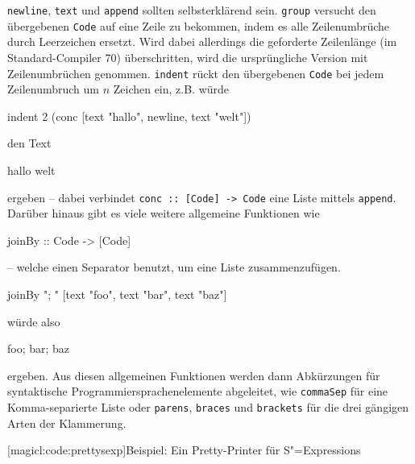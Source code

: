 \documentclass[11pt, a4paper, bibgerm]{scrbook}
\newenvironment{DIFnomarkup}{}{}
\newcommand\icode[1]{\lstinline?#1?}
\newcommand\lsubsection{}
\newcommand{\sexps}{S"=Expressions}
\begin{document}
\icode{newline}, \icode{text} und \icode{append} sollten selbsterklärend
sein. \icode{group} versucht den übergebenen \icode{Code} auf eine Zeile
zu bekommen, indem es alle Zeilenumbrüche durch Leerzeichen
ersetzt. Wird dabei allerdings die geforderte Zeilenlänge (im
Standard-Compiler 70) überschritten, wird die ursprüngliche Version mit
Zeilenumbrüchen genommen. \icode{indent} rückt den übergebenen
\icode{Code} bei jedem Zeilenumbruch um $n$ Zeichen ein, z.B. würde
\begin{DIFnomarkup}\begin{code}
indent 2 (conc [text "hallo", newline, text "welt"])
\end{code}\end{DIFnomarkup}
den Text
\begin{DIFnomarkup}\begin{code}
hallo
  welt
\end{code}\end{DIFnomarkup}
ergeben -- dabei verbindet \icode{conc :: [Code] -> Code} eine Liste
mittels \icode{append}. Darüber hinaus gibt es viele weitere allgemeine
Funktionen wie
\begin{DIFnomarkup}\begin{code}
  joinBy :: Code -> [Code]
\end{code}\end{DIFnomarkup}
-- welche einen Separator benutzt, um eine Liste zusammenzufügen.
\begin{DIFnomarkup}\begin{code}
joinBy "; " [text "foo", text "bar", text "baz"]
\end{code}\end{DIFnomarkup}
würde also
\begin{DIFnomarkup}\begin{code}
foo; bar; baz
\end{code}\end{DIFnomarkup}
ergeben. Aus diesen allgemeinen Funktionen werden dann Abkürzungen für
syntaktische Programmiersprachenelemente abgeleitet, wie
\icode{commaSep} für eine Komma-separierte Liste oder \icode{parens},
\icode{braces} und \icode{brackets} für die drei gängigen Arten der
Klammerung.

\lsubsection[magicl:code:prettysexp]{Beispiel: Ein Pretty-Printer für \sexps{}}
\end{document}

